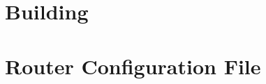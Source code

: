 \chapter{Building}
\label{appendix:build}

\chapter{Router Configuration File}
\label{appendix:config}
\lstset{language=inform}
  
